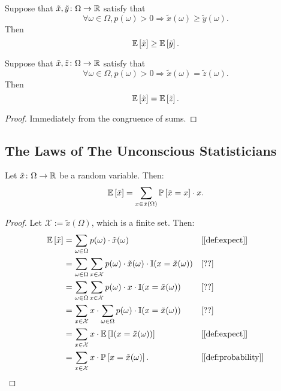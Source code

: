 \begin{theorem} \label{thm:exp-monotone}
  Suppose that $\tilde{x}, \tilde{y} \colon \Omega \to \mathbb{R}$ satisfy that
  \[
    \forall \omega \in \Omega, p(\omega ) > 0 \Rightarrow \tilde{x}(\omega) \ge \tilde{y}(\omega).
  \]
  Then
  \[
   \mathbb{E}\left[\tilde{x}\right] \ge \mathbb{E}\left[\tilde{y}\right] .
  \]
\end{theorem}


\begin{theorem} \label{thm:exp-congr}
  Suppose that $\tilde{x}, \tilde{z} \colon \Omega \to \mathbb{R}$ satisfy that
  \[
     \forall \omega \in \Omega, p(\omega) > 0 \Rightarrow \tilde{x}(\omega) = \tilde{z}(\omega).
  \]
  Then
  \[
   \mathbb{E} \left[ \tilde{x} \right] = \mathbb{E} \left[ \tilde{z} \right].
  \]
\end{theorem}
\begin{proof}
Immediately from the congruence of sums.
\end{proof}
\subsection{The Laws of The Unconscious Statisticians}

\begin{theorem} \label{thm:exp-sum-val}
Let $\tilde{x} \colon \Omega \to \mathbb{R} $ be a random variable. Then:
\[
\mathbb{E} \left[ \tilde{x} \right]
=
\sum_{x\in \tilde{x}(\Omega)} \mathbb{P} \left[ \tilde{x} = x \right] \cdot  x. 
\]
\end{theorem}
\begin{proof}
Let $\mathcal{X} := \tilde{x}(\Omega)$, which is a finite set. Then:
\begin{align*}
\E \left[ \tilde{x} \right]
&= \sum_{\omega \in \Omega } p(\omega ) \cdot \tilde{x}(\omega) && \why{\cref{def:expect}} \\
&= \sum_{\omega \in \Omega } \sum_{x\in \mathcal{X}} p(\omega ) \cdot \tilde{x}(\omega) \cdot \I(x =  \tilde{x}(\omega)) && \why{??} \\
&= \sum_{\omega \in \Omega } \sum_{x\in \mathcal{X}} p(\omega ) \cdot x \cdot \I(x =  \tilde{x}(\omega)) && \why{??} \\
&= \sum_{x\in \mathcal{X}} x \cdot \sum_{\omega \in \Omega }  p(\omega ) \cdot  \I(x =  \tilde{x}(\omega))  && \why{??}\\
&= \sum_{x\in \mathcal{X}} x \cdot \E \left[  \I(x =  \tilde{x}(\omega)) \right] && \why{\cref{def:expect}} \\
&= \sum_{x\in \mathcal{X}} x \cdot \PP \left[x =  \tilde{x}(\omega) \right]. && \why{\cref{def:probability}} 
\end{align*}
\end{proof}


